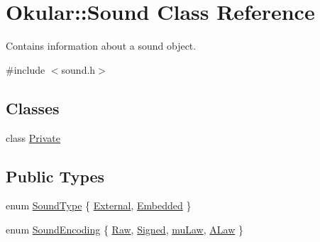 \hypertarget{classOkular_1_1Sound}{\section{Okular\+:\+:Sound Class Reference}
\label{classOkular_1_1Sound}
}


Contains information about a sound object.  




{\ttfamily \#include $<$sound.\+h$>$}

\subsection*{Classes}
\begin{DoxyCompactItemize}
\item 
class \hyperlink{classSound_1_1Private}{Private}
\end{DoxyCompactItemize}
\subsection*{Public Types}
\begin{DoxyCompactItemize}
\item 
enum \hyperlink{classOkular_1_1Sound_aed586d1d0455f4309b1309b9954d5c04}{Sound\+Type} \{ \hyperlink{classOkular_1_1Sound_aed586d1d0455f4309b1309b9954d5c04a6b086485afe0876219888635155ab044}{External}, 
\hyperlink{classOkular_1_1Sound_aed586d1d0455f4309b1309b9954d5c04a60ea85a24b9ea3862fd7a17b3b74952b}{Embedded}
 \}
\item 
enum \hyperlink{classOkular_1_1Sound_a4bc04dce6aa25c5aadb2f93d0fafe5f8}{Sound\+Encoding} \{ \hyperlink{classOkular_1_1Sound_a4bc04dce6aa25c5aadb2f93d0fafe5f8a10d7500cc3f7778181b9850512b0507a}{Raw}, 
\hyperlink{classOkular_1_1Sound_a4bc04dce6aa25c5aadb2f93d0fafe5f8ad923ae0ea21dd58a4b1e7d380b8daf59}{Signed}, 
\hyperlink{classOkular_1_1Sound_a4bc04dce6aa25c5aadb2f93d0fafe5f8a99878763f9826b226f11ca376739c9af}{mu\+Law}, 
\hyperlink{classOkular_1_1Sound_a4bc04dce6aa25c5aadb2f93d0fafe5f8a6ef006851290e544293f6305886d6b07}{A\+Law}
 \}
\end{DoxyCompactItemize}
